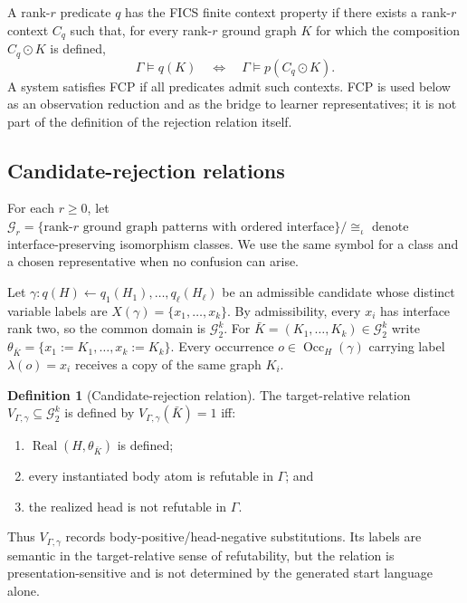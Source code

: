 \documentclass[11pt]{article}
\theoremstyle{definition}
\newtheorem{definition}[theorem]{Definition}
\theoremstyle{remark}
\newcommand{\Gtwo}{\mathcal G_2}
\newcommand{\Real}{\operatorname{Real}}
\begin{document}
A rank-\(r\) predicate \(q\) has the FICS finite context property if there
exists a rank-\(r\) context \(C_q\) such that, for every rank-\(r\) ground
graph \(K\) for which the composition \(C_q\odot K\) is defined,
\[
\Gamma\models q(K)
\quad\Longleftrightarrow\quad
\Gamma\models p(C_q\odot K).
\]
A system satisfies FCP if all predicates admit such contexts.  FCP is used
below as an observation reduction and as the bridge to learner
representatives; it is not part of the definition of the rejection relation
itself.

\subsection{Candidate-rejection relations}

For each \(r\ge0\), let
\(\mathcal G_r = \{\text{rank-}r\text{ ground graph patterns with ordered interface}\}/\!\cong_\iota\)
denote interface-preserving isomorphism classes. We use the same symbol for a
class and a chosen representative when no confusion can arise.

Let
\(\gamma: q(H)\leftarrow q_1(H_1),\ldots,q_\ell(H_\ell)\)
be an admissible candidate whose distinct variable labels are
\(X(\gamma)=\{x_1,\ldots,x_k\}.\)
By admissibility, every \(x_i\) has interface rank two, so the common domain is
\(\Gtwo^k\). For
\(\bar K=(K_1,\ldots,K_k)\in\Gtwo^k\)
write
\(\theta_{\bar K}=\{x_1:=K_1,\ldots,x_k:=K_k\}.\)
Every occurrence \(o\in\operatorname{Occ}_H(\gamma)\) carrying label
\(\lambda(o)=x_i\) receives a copy of the same graph \(K_i\).

\begin{definition}[Candidate-rejection relation]
The target-relative relation \(V_{\Gamma,\gamma}\subseteq\Gtwo^k\) is defined
by \(V_{\Gamma,\gamma}(\bar K)=1\) iff:
\begin{enumerate}[label=(\roman*)]
\item \(\Real(H,\theta_{\bar K})\) is defined;
\item every instantiated body atom is refutable in \(\Gamma\); and
\item the realized head is not refutable in \(\Gamma\).
\end{enumerate}
\end{definition}

Thus \(V_{\Gamma,\gamma}\) records body-positive/head-negative substitutions.
Its labels are semantic in the target-relative sense of refutability, but the
relation is presentation-sensitive and is not determined by the generated
start language alone.
\end{document}
